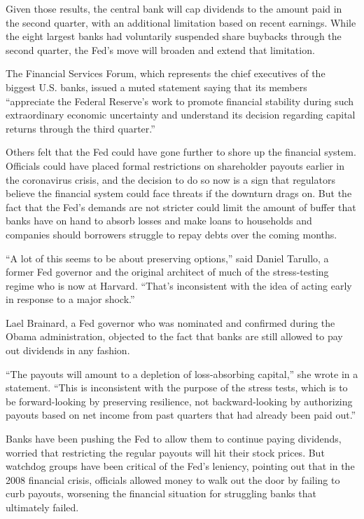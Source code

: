 Given those results, the central bank will cap dividends to the amount
paid in the second quarter, with an additional limitation based on
recent earnings. While the eight largest banks had voluntarily suspended
share buybacks through the second quarter, the Fed's move will broaden
and extend that limitation.

The Financial Services Forum, which represents the chief executives of
the biggest U.S. banks, issued a muted statement saying that its members
``appreciate the Federal Reserve's work to promote financial stability
during such extraordinary economic uncertainty and understand its
decision regarding capital returns through the third quarter.''

Others felt that the Fed could have gone further to shore up the
financial system. Officials could have placed formal restrictions on
shareholder payouts earlier in the coronavirus crisis, and the decision
to do so now is a sign that regulators believe the financial system
could face threats if the downturn drags on. But the fact that the Fed's
demands are not stricter could limit the amount of buffer that banks
have on hand to absorb losses and make loans to households and companies
should borrowers struggle to repay debts over the coming months.

``A lot of this seems to be about preserving options,'' said Daniel
Tarullo, a former Fed governor and the original architect of much of the
stress-testing regime who is now at Harvard. ``That's inconsistent with
the idea of acting early in response to a major shock.''

Lael Brainard, a Fed governor who was nominated and confirmed during the
Obama administration, objected to the fact that banks are still allowed
to pay out dividends in any fashion.

``The payouts will amount to a depletion of loss-absorbing capital,''
she wrote in a statement. ``This is inconsistent with the purpose of the
stress tests, which is to be forward-looking by preserving resilience,
not backward-looking by authorizing payouts based on net income from
past quarters that had already been paid out.''

Banks have been pushing the Fed to allow them to continue paying
dividends, worried that restricting the regular payouts will hit their
stock prices. But watchdog groups have been critical of the Fed's
leniency, pointing out that in the 2008 financial crisis, officials
allowed money to walk out the door by failing to curb payouts, worsening
the financial situation for struggling banks that ultimately failed.

